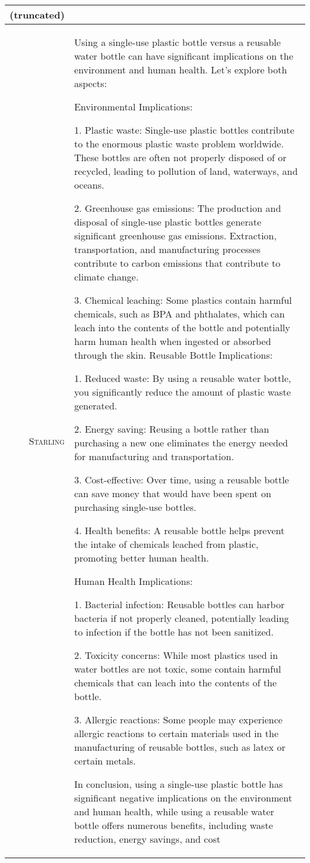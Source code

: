 \documentclass{article}
\newlength\mydepth
\newcommand{\starlingemojititle}{\textsc{Starling}\raisebox{-\mydepth}{\texttt{[image: images/starling-final.png]}}}
\begin{document}
{{\begin{tabularx}{\linewidth}{r X}
(truncated)
\\
 \midrule \starlingemojititle{}  &
Using a single-use plastic bottle versus a reusable water bottle can have significant implications on the environment and human health. Let's explore both aspects:

Environmental Implications:

1. Plastic waste: Single-use plastic bottles contribute to the enormous plastic waste problem worldwide. These bottles are often not properly disposed of or recycled, leading to pollution of land, waterways, and oceans.

2. Greenhouse gas emissions: The production and disposal of single-use plastic bottles generate significant greenhouse gas emissions. Extraction, transportation, and manufacturing processes contribute to carbon emissions that contribute to climate change.

3. Chemical leaching: Some plastics contain harmful chemicals, such as BPA and phthalates, which can leach into the contents of the bottle and potentially harm human health when ingested or absorbed through the skin.
Reusable Bottle Implications:

1. Reduced waste: By using a reusable water bottle, you significantly reduce the amount of plastic waste generated.

2. Energy saving: Reusing a bottle rather than purchasing a new one eliminates the energy needed for manufacturing and transportation.

3. Cost-effective: Over time, using a reusable bottle can save money that would have been spent on purchasing single-use bottles.

4. Health benefits: A reusable bottle helps prevent the intake of chemicals leached from plastic, promoting better human health.

Human Health Implications:

1. Bacterial infection: Reusable bottles can harbor bacteria if not properly cleaned, potentially leading to infection if the bottle has not been sanitized.

2. Toxicity concerns: While most plastics used in water bottles are not toxic, some contain harmful chemicals that can leach into the contents of the bottle.

3. Allergic reactions: Some people may experience allergic reactions to certain materials used in the manufacturing of reusable bottles, such as latex or certain metals.

In conclusion, using a single-use plastic bottle has significant negative implications on the environment and human health, while using a reusable water bottle offers numerous benefits, including waste reduction, energy savings, and cost 


\end{tabularx}}}
\end{document}

